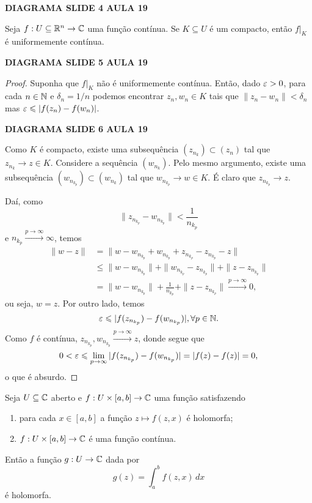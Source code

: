 %
\begin{center}
    {\bf DIAGRAMA SLIDE 4 AULA 19}
\end{center}
%
\begin{teorema}
Seja $f:U\subseteq\mathbb{R}^n\to\mathbb{C}$ uma função contínua. Se $K\subseteq U$ é um compacto,
então $f\big|_K$ é uniformemente contínua.
\end{teorema}
%
\begin{center}
    {\bf DIAGRAMA SLIDE 5 AULA 19}
\end{center}
%
\begin{proof}
Suponha que $f\big|_K$ não é uniformemente contínua. Então, dado $\varepsilon>0$, para
cada $n\in\mathbb{N}$ e $\delta_n = 1/n$ podemos encontrar $z_n, w_n\in K$ tais que
$\|z_n - w_n\| < \delta_n$ mas $\varepsilon\leqslant |f(z_n) - f(w_n)|$.
%
\begin{center}
    {\bf DIAGRAMA SLIDE 6 AULA 19}
\end{center}
%
Como $K$ é compacto, existe uma subsequência $(z_{n_k})\subset (z_n)$ tal que
$z_{n_k} \to z\in K$. Considere a sequência $(w_{n_k})$. Pelo mesmo argumento, existe
uma subsequência $(w_{n_{k_p}})\subset (w_{n_k})$ tal que
$w_{n_{k_p}} \to w\in K$. É claro que $z_{n_{k_p}} \to z$.

Daí, como
%
\[
\| z_{n_{k_p}} - w_{n_{k_p}} \| < \frac{1}{n_{k_p}}
\]
%
e $n_{k_p} \xrightarrow{p\to\infty} \infty$, temos
%
\begin{align*}
    \| w - z \| &= \| w - w_{n_{k_p}} + w_{n_{k_p}} + z_{n_{k_p}} - z_{n_{k_p}} - z \| \\
                &\leq \| w - w_{n_{k_p}} \| + \| w_{n_{k_p}} - z_{n_{k_p}} \| + \| z - z_{n_{k_p}} \|\\
                &= \| w - w_{n_{k_p}} \| + \frac{1}{n_{k_p}} + \| z - z_{n_{k_p}} \|
                \xrightarrow{p\to\infty} 0,
\end{align*}
%
ou seja, $w = z$. Por outro lado, temos
%
\[
\varepsilon \leqslant |f(z_{n_{k_p}}) - f(w_{n_{k_p}})|, \forall p\in\mathbb{N}.
\]
%
Como $f$ é contínua, $z_{n_{k_p}}, w_{n_{k_p}} \xrightarrow{p\to\infty} z$, donde segue que
%
\[
0 < \varepsilon \leqslant \lim_{p\to\infty} |f(z_{n_{k_p}}) - f(w_{n_{k_p}})| = |f(z) - f(z)| = 0,
\]
%
o que é absurdo.
\end{proof}
%
\begin{teorema}
Seja $U\subseteq\mathbb{C}$ aberto e $f:U\times[a,b]\to\mathbb{C}$ uma função satisfazendo
%
\begin{enumerate}[1)]
    \item para cada $x\in[a,b]$ a função $z\mapsto f(z,x)$ é holomorfa;
    \item $f:U\times[a,b]\to\mathbb{C}$ é uma função contínua.
\end{enumerate}
%
Então a função $g:U\to\mathbb{C}$ dada por
%
\[
g(z) = \int_a^b f(z,x) \, dx
\]
%
é holomorfa.
\end{teorema}
